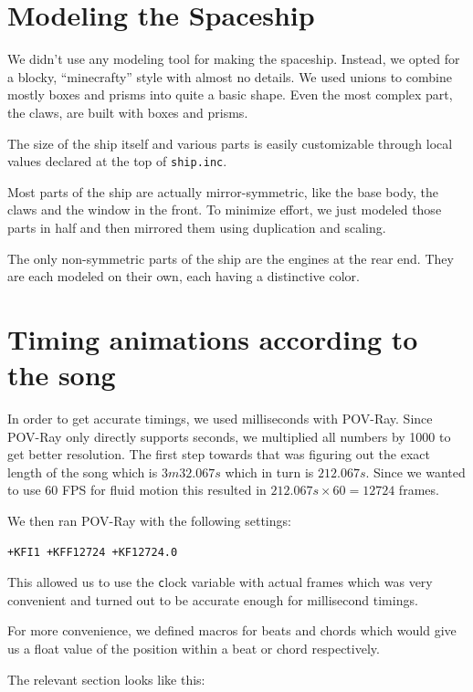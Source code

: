 \documentclass[a4paper, 12pt]{scrartcl}
\begin{document}
    \section{Modeling the Spaceship}
    \label{sec:ship}

    We didn't use any modeling tool for making the spaceship. Instead, we opted for a blocky,
    ``minecrafty'' style with almost no details. We used unions to combine mostly boxes and prisms
    into quite a basic shape. Even the most complex part, the claws, are built with boxes and
    prisms.

    The size of the ship itself and various parts is easily customizable through local values
    declared at the top of \texttt{ship.inc}.

    Most parts of the ship are actually mirror-symmetric, like the base body, the claws and the
    window in the front. To minimize effort, we just modeled those parts in half and then mirrored
    them using duplication and scaling.

    The only non-symmetric parts of the ship are the engines at the rear end. They are each modeled
    on their own, each having a distinctive color.

    \section{Timing animations according to the song}

    In order to get accurate timings, we used milliseconds with POV-Ray. Since POV-Ray only
    directly supports seconds, we multiplied all numbers by 1000 to get better resolution.  The
    first step towards that was figuring out the exact length of the song which is \(3m32.067s\)
    which in turn is \(212.067s\). Since we wanted to use 60 FPS for fluid motion this resulted in
    \(212.067s \times 60 = 12724\) frames. 

    We then ran POV-Ray with the following settings:
    \begin{verbatim}+KFI1 +KFF12724 +KF12724.0\end{verbatim}
    This allowed us to use the \texttt clock variable with actual frames
    which was very convenient and turned out to be accurate enough for millisecond timings.

    For more convenience, we defined macros for beats and chords which would give us a float value
    of the position within a beat or chord respectively.

    The relevant section looks like this:
\end{document}
